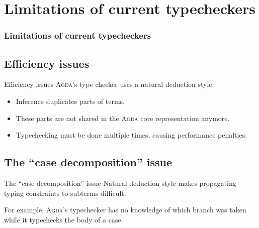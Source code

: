 \documentclass[xcolor=svgnames,11pt]{beamer}
\newcommand{\agda}{\textsc{Agda}\xspace}
\begin{document}
\section{Limitations of current typecheckers}
\begin{frame}
  \frametitle{Limitations of current typecheckers}
  \tableofcontents[currentsection]
\end{frame}

\subsection{Efficiency issues}
\begin{frame}{Efficiency issues}
  \agda's type checker uses a natural deduction style:
  \begin{itemize}
  \item Inference duplicates parts of terms.
  \item These parts are not shared in the \agda core representation anymore.
  \item Typechecking must be done multiple times, causing performance penalties.
  \end{itemize}
  \pause
  \begin{figure}
    \centering
  \end{figure}
\end{frame}

\subsection{The ``case decomposition'' issue}
\begin{frame}{The ``case decomposition'' issue}
  Natural deduction style makes propagating typing constraints to subterms difficult.

  For example, \agda's typechecker has no knowledge of which branch was taken while it typechecks the body of a case.
  \begin{center}
    \begin{minipage}{0.9\textwidth}
      
    \end{minipage}
  \end{center}
\end{frame}
\end{document}
